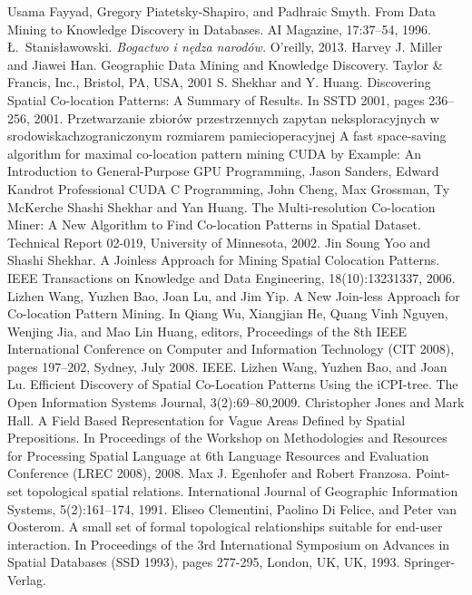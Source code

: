 \documentclass[12pt]{article}
\begin{document}
\begin{thebibliography}{}
Usama Fayyad, Gregory Piatetsky-Shapiro, and Padhraic Smyth. From Data Mining to Knowledge Discovery in Databases. AI Magazine, 17:37–54, 1996.
Ł.~Stanisławowski. \emph{Bogactwo i nędza narodów.}
O'reilly, 2013.
 Harvey J. Miller and Jiawei Han. Geographic Data Mining and Knowledge Discovery.
Taylor \& Francis, Inc., Bristol, PA, USA, 2001
 S. Shekhar and Y. Huang. Discovering Spatial Co-location Patterns: A Summary of Results. In SSTD 2001, pages 236–256, 2001.
 Przetwarzanie zbiorów przestrzennych zapytan neksploracyjnych w srodowiskachzograniczonym rozmiarem pamiecioperacyjnej
A fast space-saving algorithm for maximal co-location pattern mining
CUDA by Example: An Introduction to General-Purpose GPU Programming, Jason Sanders, Edward Kandrot
Professional CUDA C Programming, John Cheng, Max Grossman, Ty McKerche
Shashi Shekhar and Yan Huang. The Multi-resolution Co-location Miner: A New Algorithm to Find Co-location Patterns in Spatial Dataset. Technical Report 02-019, University of Minnesota, 2002.
Jin Soung Yoo and Shashi Shekhar. A Joinless Approach for Mining Spatial Colocation Patterns. IEEE Transactions on Knowledge and Data Engineering, 18(10):13231337, 2006.
Lizhen Wang, Yuzhen Bao, Joan Lu, and Jim Yip. A New Join-less Approach for Co-location Pattern Mining. In Qiang Wu, Xiangjian He, Quang Vinh Nguyen, Wenjing Jia, and Mao Lin Huang, editors, Proceedings of the 8th IEEE International
Conference on Computer and Information Technology (CIT 2008), pages 197–202, Sydney, July 2008. IEEE.
Lizhen Wang, Yuzhen Bao, and Joan Lu. Efficient Discovery of Spatial Co-Location Patterns Using the iCPI-tree. The Open Information Systems Journal, 3(2):69–80,2009.
Christopher Jones and Mark Hall. A Field Based Representation for Vague Areas Defined by Spatial Prepositions. In Proceedings of the Workshop on Methodologies and Resources for Processing Spatial Language at 6th Language Resources and Evaluation Conference (LREC 2008), 2008.
Max J. Egenhofer and Robert Franzosa. Point-set topological spatial relations. International Journal of Geographic Information Systems, 5(2):161–174, 1991.
 Eliseo Clementini, Paolino Di Felice, and Peter van Oosterom. A small set of formal topological relationships suitable for end-user interaction. In Proceedings of the 3rd International Symposium on Advances in Spatial Databases (SSD 1993), pages 277-295, London, UK, UK, 1993. Springer-Verlag.

\end{thebibliography}
\end{document}

